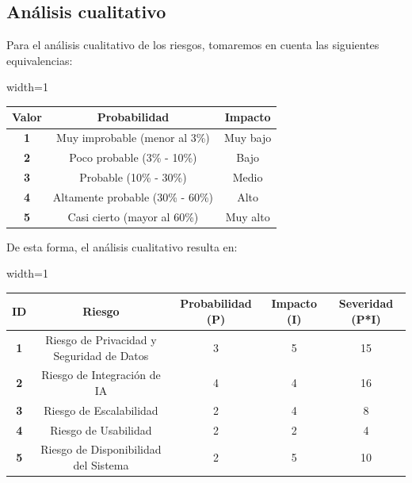 \documentclass[a4paper,12pt]{article}
\begin{document}
    \subsection{Análisis cualitativo}
    \par Para el análisis cualitativo de los riesgos, tomaremos en cuenta las siguientes equivalencias:
    \begin{center}
        \begin{adjustbox}{width=1\textwidth}
            \begin{tabular}{ |c|c|c| }
                \hline
                \rowcolor{lightgray} \textbf{Valor} & \textbf{Probabilidad} & \textbf{Impacto} \\
                \hline    
                \textbf{1} & Muy improbable (menor al 3\%) & Muy bajo \\
                \hline
                \textbf{2} & Poco probable (3\% - 10\%) & Bajo \\
                \hline
                \textbf{3} & Probable (10\% - 30\%) & Medio \\
                \hline
                \textbf{4} & Altamente probable (30\% - 60\%) & Alto \\
                \hline
                \textbf{5} & Casi cierto (mayor al 60\%) & Muy alto \\
                \hline
            \end{tabular}
        \end{adjustbox}
    \end{center}
    \par De esta forma, el análisis cualitativo resulta en:
    \begin{center}
        \begin{adjustbox}{width=1\textwidth}
            \begin{tabular}{ |c|c|c|c|c| }
                \hline
                \rowcolor{lightgray} \textbf{ID} & \textbf{Riesgo} & \textbf{Probabilidad (P)} & \textbf{Impacto (I)} & \textbf{Severidad (P*I)} \\
                \hline    
                \textbf{1} & Riesgo de Privacidad y Seguridad de Datos & 3 & 5 & 15 \\
                \hline
                \textbf{2} & Riesgo de Integración de IA & 4 & 4 & 16 \\
                \hline
                \textbf{3} & Riesgo de Escalabilidad & 2 & 4 & 8 \\
                \hline
                \textbf{4} & Riesgo de Usabilidad & 2 & 2 & 4 \\
                \hline
                \textbf{5} & Riesgo de Disponibilidad del Sistema & 2 & 5 & 10 \\
                \hline
            \end{tabular}
        \end{adjustbox}
    \end{center}
\end{document}
